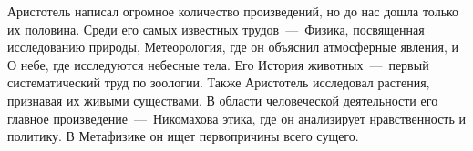 

Аристотель написал огромное количество произведений, но до нас дошла только их половина. Среди его самых известных трудов~---~Физика, посвященная исследованию природы, Метеорология, где он объяснил атмосферные явления, и О небе, где исследуются небесные тела. Его История животных~---~первый систематический труд по зоологии. Также Аристотель исследовал растения, признавая их живыми существами. В области человеческой деятельности его главное произведение~---~Никомахова этика, где он анализирует нравственность и политику. В Метафизике он ищет первопричины всего сущего.

